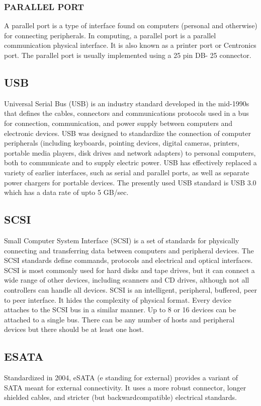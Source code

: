 		\subsubsection*{PARALLEL PORT}
	 A parallel port is a type of interface found on computers (personal and otherwise) for
	connecting peripherals. In computing, a parallel port is a parallel communication physical interface. It is
	also known as a printer port or Centronics port. The parallel port is usually implemented using a 25 pin DB-
	25 connector.
		\subsection*{USB}
	 Universal Serial Bus (USB) is an industry standard developed in the mid-1990s that defines the
	cables, connectors and communications protocols used in a bus for connection, communication, and power
	supply between computers and electronic devices. USB was designed to standardize the connection
	of computer peripherals (including keyboards, pointing devices, digital cameras, printers, portable media
	players, disk drives and network adapters) to personal computers, both to communicate and to
	supply electric power. USB has effectively replaced a variety of earlier interfaces, such as serial and parallel 		ports,
	as well as separate power chargers for portable devices. The presently used USB standard is USB 3.0 which
	has a data rate of upto 5 GB/sec.
		\subsection*{ SCSI}
	 Small Computer System Interface (SCSI) is a set of standards for physically connecting and
	transferring data between computers and peripheral devices. The SCSI standards define commands,
	protocols and electrical and optical interfaces. SCSI is most commonly used for hard disks and tape drives,
	but it can connect a wide range of other devices, including scanners and CD drives, although not all
	controllers can handle all devices. SCSI is an intelligent, peripheral, buffered, peer to peer interface. It hides
	the complexity of physical format. Every device attaches to the SCSI bus in a similar manner. Up to 8 or 16
	devices can be attached to a single bus. There can be any number of hosts and peripheral devices but there
	should be at least one host.
		\subsection*{ ESATA}
	 Standardized in 2004, eSATA (e standing for external) provides a variant of SATA meant for
	external connectivity. It uses a more robust connector, longer shielded cables, and stricter (but backwardcompatible)
	electrical standards.
